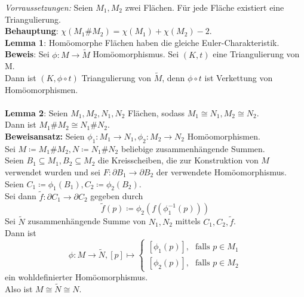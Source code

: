 \begin{problem}[2]
  \emph{Vorraussetzungen:} Seien \( M_1, M_2 \) zwei Flächen. Für jede Fläche existiert eine Triangulierung. \\
  \textbf{Behauptung}: \( \chi(M_1 \# M_2) = \chi(M_1) + \chi(M_2) - 2 \). \\
  \textbf{Lemma 1}: Homöomorphe Flächen haben die gleiche Euler-Charakteristik. \\
  \textbf{Beweis}: Sei \( \phi : M \to \tilde{M} \) Homöomorphismus. Sei \( (K,t) \) eine Triangulierung von M. \\
  Dann ist \( (K,\phi \circ t) \) Triangulierung von \( \tilde{M} \), denn \( \phi \circ t \) ist Verkettung von Homöomorphismen. \\
  \  \\
  \textbf{Lemma 2}: Seien \( M_1, M_2, N_1, N_2 \) Flächen, sodass \( M_1 \cong N_1, M_2 \cong N_2 \). \\
  Dann ist \( M_1 \# M_2 \cong N_1 \# N_2 \). \\
  \textbf{Beweisansatz:} Seien \( \phi_1: M_1 \to N_1, \phi_2: M_2 \to N_2 \) Homöomorphismen. \\
  Sei \( M \coloneqq M_1 \# M_2 , N \coloneqq N_1 \# N_2 \) beliebige zusammenhängende Summen. \\
  Seien \( B_1 \subseteq M_1, B_2 \subseteq M_2 \) die Kreisscheiben, die zur Konstruktion von \( M \) verwendet wurden und sei \( F: \partial B_1 \to \partial B_2 \) der verwendete Homöomorphismus. \\
  Seien \( C_1 \coloneqq \phi_1 (B_1), C_2 \coloneqq \phi_2 (B_2) \). \\
  Sei dann \( \tilde{f} : \partial C_1 \to \partial C_2 \) gegeben durch 
  \begin{equation*}
    \tilde{f}(p) \coloneqq \phi_2 (f(\phi_1^{-1}(p)))
  \end{equation*}
  Sei \( \tilde{N} \) zusammenhängende Summe von \( N_1, N_2 \) mittels \( C_1, C_2, \tilde{f} \). \\
  Dann ist
  \begin{equation*}
    \phi: M \to \tilde{N}, [p] \mapsto \begin{cases}
      [\phi_1(p)]\text{,} &\text{falls } p \in M_1 \\
      [\phi_2(p)]\text{,} &\text{falls } p \in M_2
    \end{cases}
  \end{equation*}
  ein wohldefinierter Homöomorphismus. \\
  Also ist \( M \cong \tilde{N} \cong N \). \\
  

\end{problem}
